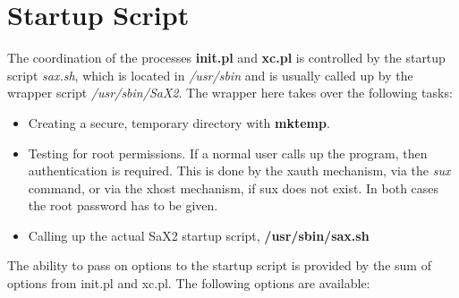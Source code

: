 \section{Startup Script}
\label{sec:sta}
The coordination of the processes \textbf{init.pl} and \textbf{xc.pl}
is controlled by the startup script \textit{sax.sh}, 
which is located in \textit{/usr/sbin} and is usually called up by the 
wrapper script \textit{/usr/sbin/SaX2}. The wrapper here takes over the
following tasks:
\begin{itemize}
\item Creating a secure, temporary directory with \textbf{mktemp}. 
\item Testing for root permissions. If a normal user calls up the program,
      then authentication is required. This is done by the xauth mechanism, via
      the  \textit{sux} command, or via the xhost mechanism, if sux does not
      exist. In both cases the root password has to be given.  
\item Calling up the actual SaX2 startup script, \textbf{/usr/sbin/sax.sh}
\end{itemize}
The ability to pass on options to the startup script is provided by the sum of
options from init.pl and xc.pl. The following options are available:
